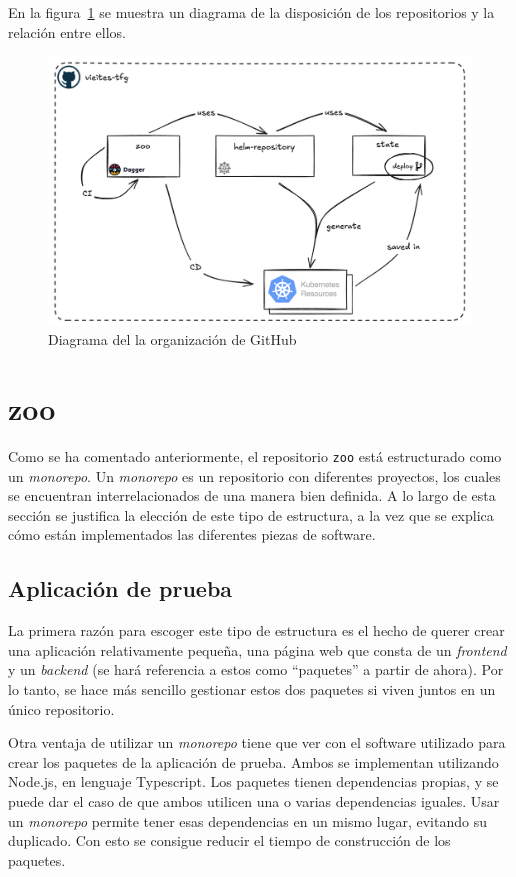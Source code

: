 En la figura~\ref{fig:ghorg} se muestra un diagrama de la disposición de los repositorios y la relación entre ellos.

\begin{figure}
  \centerline{\includegraphics[width=15cm]{figuras/vieites-tfg}}
  \caption{Diagrama del la organización de GitHub}
  \label{fig:ghorg}
\end{figure}

\section*{zoo}

Como se ha comentado anteriormente, el repositorio \texttt{zoo} está estructurado como un \textit{monorepo}. Un \textit{monorepo} es un repositorio con diferentes proyectos, los cuales se encuentran interrelacionados de una manera bien definida. A lo largo de esta sección se justifica la elección de este tipo de estructura, a la vez que se explica cómo están implementados las diferentes piezas de software.

\subsection*{Aplicación de prueba}

La primera razón para escoger este tipo de estructura es el hecho de querer crear una aplicación relativamente pequeña, una página web que consta de un \textit{frontend} y un \textit{backend} (se hará referencia a estos como ``paquetes'' a partir de ahora). Por lo tanto, se hace más sencillo gestionar estos dos paquetes si viven juntos en un único repositorio.

Otra ventaja de utilizar un \textit{monorepo} tiene que ver con el software utilizado para crear los paquetes de la aplicación de prueba. Ambos se implementan utilizando Node.js, en lenguaje Typescript\cite{ts}. Los paquetes tienen dependencias propias, y se puede dar el caso de que ambos utilicen una o varias dependencias iguales. Usar un \textit{monorepo} permite tener esas dependencias en un mismo lugar, evitando su duplicado. Con esto se consigue reducir el tiempo de construcción de los paquetes.

